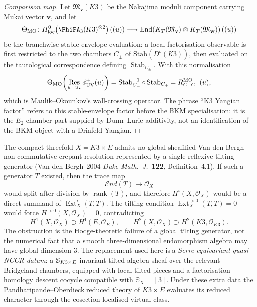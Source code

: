 \begin{proof}[Comparison map]
Let $\mathfrak M_{\mathbf v}(K3)$ be the Nakajima moduli component carrying Mukai vector $\mathbf v$, and let
\[
 \ThetaMO\colon
 H^0_{\mathrm{loc}}\!\left(\PhiFA_3(K3)^{\otimes 2}\right)((u))
 \longrightarrow
 \operatorname{End}\!\left(K_T(\mathfrak M_{\mathbf v})\otimes
 K_T(\mathfrak M_{\mathbf w})\right)((u))
\]
be the branchwise stable-envelope evaluation: a local factorisation observable is first restricted to the two chambers $C_\pm$ of $\mathrm{Stab}(D^b(K3))$, then evaluated on the tautological correspondence defining $\operatorname{Stab}_{C_\pm}$. With this normalisation
\[
 \Theta_{\mathrm{MO}}\!\left(\mathop{\mathrm{Res}}_{u=u_\star}\phi^+_{\mathrm{UV}}(u)\right)
 =
 \operatorname{Stab}_{C_-}^{-1}\circ\operatorname{Stab}_{C_+}
 =
 R^{\mathrm{MO}}_{C_+C_-}(u),
\]
which is Maulik--Okounkov's wall-crossing operator. The phrase ``K3 Yangian factor'' refers to this stable-envelope factor before the BKM specialisation: it is the $E_2$-chamber part supplied by Dunn--Lurie additivity, not an identification of the BKM object with a Drinfeld Yangian.
\end{proof}

\begin{proposition}
\label{prop:k3e-no-global-nccr-serre-equivariant-substitute}
The compact threefold $X = K3 \times E$ admits no global sheafified Van den Bergh non-commutative crepant resolution represented by a single reflexive tilting generator (Van den Bergh~$2004$ \emph{Duke Math.\ J.}~\textbf{122}, Definition~$4.1$). If such a generator $T$ existed, then the trace map
\[
 \mathcal{E}nd(T)\longrightarrow \mathcal O_X
\]
would split after division by $\operatorname{rank}(T)$, and therefore $H^i(X,\mathcal O_X)$ would be a direct summand of $\operatorname{Ext}^i_X(T,T)$. The tilting condition $\operatorname{Ext}^{>0}_X(T,T)=0$ would force $H^{>0}(X,\mathcal O_X)=0$, contradicting
\[
 H^1(X,\mathcal O_X)\supset H^1(E,\mathcal O_E),\qquad
 H^2(X,\mathcal O_X)\supset H^2(K3,\mathcal O_{K3}).
\]
The obstruction is the Hodge-theoretic failure of a global tilting generator, not the numerical fact that a smooth three-dimensional endomorphism algebra may have global dimension $3$. The replacement used here is a \emph{Serre-equivariant quasi-NCCR datum}: a $\mathbb{S}_{K3 \times E}$-invariant tilted-algebra sheaf over the relevant Bridgeland chambers, equipped with local tilted pieces and a factorisation-homology descent cocycle compatible with $\mathbb{S}_X=[3]$. Under these extra data the Pandharipande--Oberdieck reduced theory of $K3 \times E$ evaluates its reduced character through the cosection-localised virtual class.
\end{proposition}

